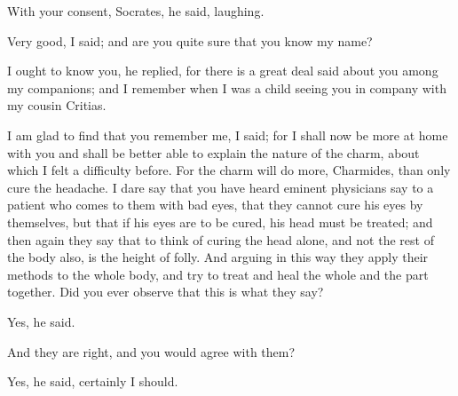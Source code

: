 \documentclass[11pt,letter]{article}
\begin{document}
\par  With your consent, Socrates, he said, laughing.

\par  Very good, I said; and are you quite sure that you know my name?

\par  I ought to know you, he replied, for there is a great deal said about you among my companions; and I remember when I was a child seeing you in company with my cousin Critias.

\par  I am glad to find that you remember me, I said; for I shall now be more at home with you and shall be better able to explain the nature of the charm, about which I felt a difficulty before. For the charm will do more, Charmides, than only cure the headache. I dare say that you have heard eminent physicians say to a patient who comes to them with bad eyes, that they cannot cure his eyes by themselves, but that if his eyes are to be cured, his head must be treated; and then again they say that to think of curing the head alone, and not the rest of the body also, is the height of folly. And arguing in this way they apply their methods to the whole body, and try to treat and heal the whole and the part together. Did you ever observe that this is what they say?

\par  Yes, he said.

\par  And they are right, and you would agree with them?

\par  Yes, he said, certainly I should.
\end{document}
